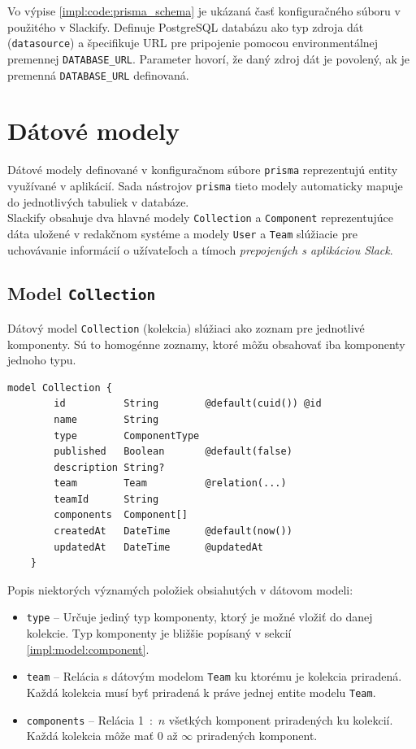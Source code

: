 \medskip

\noindent Vo výpise \ref{impl:code:prisma_schema} je ukázaná časť konfiguračného súboru v použitého v Slackify. Definuje PostgreSQL databázu ako typ zdroja dát (\texttt{datasource}) a špecifikuje URL pre pripojenie pomocou environmentálnej premennej \texttt{DATABASE\_URL}. Parameter  hovorí, že daný zdroj dát je povolený, ak je premenná \texttt{DATABASE\_URL} definovaná.

\section{Dátové modely}
Dátové modely definované v konfiguračnom súbore \texttt{prisma} reprezentujú entity využívané v aplikácií. Sada nástrojov \texttt{prisma} tieto modely automaticky mapuje do jednotlivých tabuliek v databáze. \\

\noindent Slackify obsahuje dva hlavné modely \texttt{Collection} a \texttt{Component} reprezentujúce dáta uložené v redakčnom systéme a modely \texttt{User} a \texttt{Team} slúžiacie pre uchovávanie informácií o užívateľoch a tímoch \emph{prepojených s aplikáciou Slack}.

\subsection{Model \texttt{Collection}}
Dátový model \texttt{Collection} (kolekcia) slúžiaci ako zoznam pre jednotlivé komponenty. Sú to homogénne zoznamy, ktoré môžu obsahovať iba komponenty jednoho typu.\\

\begin{lstlisting}[caption=Dátový model \texttt{Collection} v konfiguračnom súbore \texttt{prisma}.]
	model Collection {
		id          String        @default(cuid()) @id
		name        String
		type        ComponentType
		published   Boolean       @default(false)
		description String?
		team        Team          @relation(...)
		teamId      String
		components  Component[]
		createdAt   DateTime      @default(now())
		updatedAt   DateTime      @updatedAt
	}
\end{lstlisting}

\medskip

\noindent Popis niektorých významých položiek obsiahutých v dátovom modeli:

\begin{itemize}
	\item \texttt{type} -- Určuje jediný typ komponenty, ktorý je možné vložiť do danej kolekcie. Typ komponenty je bližšie popísaný v sekcií \ref{impl:model:component}.
	\item \texttt{team} -- Relácia s dátovým modelom \texttt{Team} ku ktorému je kolekcia priradená. Každá kolekcia musí byť priradená k práve jednej entite modelu \texttt{Team}.
	\item \texttt{components} -- Relácia 1~:~$n$ všetkých komponent priradených ku kolekcií. Každá kolekcia môže mať 0 až $\infty$ priradených komponent.
\end{itemize}

